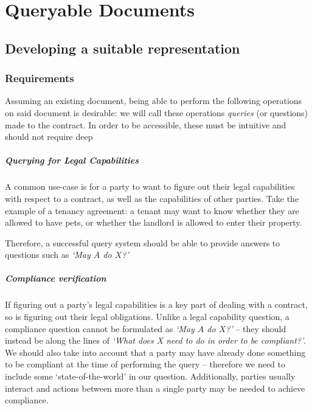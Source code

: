 \chapter{Queryable Documents}\label{ch:queries}


\section{Developing a suitable representation}\label{sec:queries-representation}

\subsection{Requirements}\label{subsec:queries-requirements}

Assuming an existing document, being able to perform the following operations on said document is desirable: we will call these operations \emph{queries} (or questions) made to the contract.
In order to be accessible, these must be intuitive and should not require deep


\paragraph{Querying for Legal Capabilities} A common use-case is for a party to want to figure out their legal capabilities with respect to a contract, as well as the capabilities of other parties.
Take the example of a tenancy agreement: a tenant may want to know whether they are allowed to have pets, or whether the landlord is allowed to enter their property.

Therefore, a successful query system should be able to provide answers to questions such as \textit{`May $A$ do $X$?'}

\paragraph{Compliance verification} If figuring out a party's legal capabilities is a key part of dealing with a contract, so is figuring out their legal obligations.
Unlike a legal capability question, a compliance question cannot be formulated as \textit{`May $A$ do $X$?'} -- they should instead be along the lines of \textit{`What does X need to do in order to be compliant?'}.
We should also take into account that a party may have already done something to be compliant at the time of performing the query -- therefore we need to include some `state-of-the-world' in our question.
Additionally, parties usually interact and actions between more than a single party may be needed to achieve compliance.

